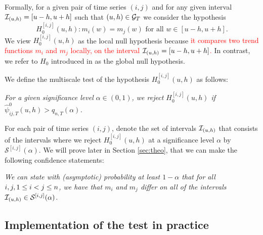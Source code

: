 \documentclass[a4paper,12pt]{article}
\makeatletter
\renewcommand{\eqref}[1]{\tagform@{\ref{#1}}}
\makeatother
\begin{document}
Formally, for a given pair of time series $(i, j)$ and for any given interval \linebreak $\mathcal{I}_{(u, h)} = [u-h, u+h]$ such that $(u, h) \in \mathcal{G}_T$ we consider the hypothesis 
\[ H_0^{[i, j]}(u, h): m_i(w) = m_j(w) \text{ for all } w \in [u-h, u+h]. \] 
We view $H_0^{[i, j]}(u, h)$ as the local null hypothesis because \textcolor{red}{it compares two trend functions $m_i$ and $m_j$ locally, on the interval $\mathcal{I}_{(u, h)} = [u-h, u+h]$.} In contrast, we refer to $H_0$ introduced in \eqref{eq:null} as the global null hypothesis.

We define the multiscale test of the hypothesis $H_0^{[i, j]}(u, h)$ as follows: 
\begin{center}
\begin{minipage}[c][1.25cm][c]{13cm}
\textit{For a given significance level $\alpha \in (0,1)$, we reject $H_0^{[i, j]}(u, h)$ if \linebreak $\hat{\psi}^0_{ij, T}(u, h) > q_{n,T}(\alpha)$.}
\end{minipage}
\end{center}

For each pair of time series $(i, j)$, denote the set of intervals $\mathcal{I}_{(u, h)}$ that consists of the intervals where we reject $H_0^{[i, j]}(u, h)$ at a significance level $\alpha$ by $\mathcal{S}^{[i, j]}(\alpha)$. We will prove later in Section \ref{sec:theo}, that we can make the following confidence statements:

\begin{center}
\begin{minipage}[c][1.45cm][c]{13cm}
\textit{We can state with (asymptotic) probability at least $1-\alpha$ that for all $i, j, \linebreak1\leq i < j \leq n$, we have that $m_i$ and $m_j$ differ on all of the intervals $\mathcal{I}_{(u, h)} \in \mathcal{S}^{[i, j]}(\alpha)$.}
\end{minipage}
\end{center}


\subsection{Implementation of the test in practice}\label{subsec:test:impl}
\end{document}

